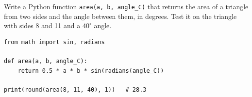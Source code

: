 \begin{Exercise}[title={A Triangle Solver}, label=lc_python]
Write a Python function \texttt{area(a, b, angle_C)} that returns the
area of a triangle from two sides and the angle between them, in degrees. Test it on
the triangle with sides 8 and 11 and a $40^\circ$ angle.
\end{Exercise}
\begin{Answer}[ref=lc_python]
\begin{verbatim}
from math import sin, radians

def area(a, b, angle_C):
    return 0.5 * a * b * sin(radians(angle_C))

print(round(area(8, 11, 40), 1))   # 28.3
\end{verbatim}
\end{Answer}
